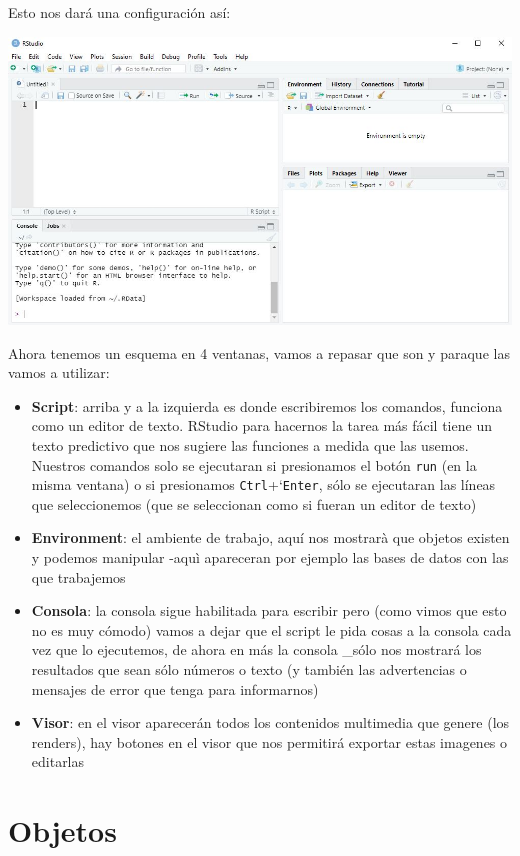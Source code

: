 \documentclass[
]{book}
\providecommand{\tightlist}{%
  \setlength{\itemsep}{0pt}\setlength{\parskip}{0pt}}
\begin{document}
Esto nos dará una configuración así:

\includegraphics[width=13.74in]{img/Rstudiofig3}

Ahora tenemos un esquema en 4 ventanas, vamos a repasar que son y paraque las vamos a utilizar:

\begin{itemize}
\tightlist
\item
  \textbf{Script}: arriba y a la izquierda es donde escribiremos los comandos, funciona como un editor de texto. RStudio para hacernos la tarea más fácil tiene un texto predictivo que nos sugiere las funciones a medida que las usemos. Nuestros comandos solo se ejecutaran si presionamos el botón \texttt{run} (en la misma ventana) o si presionamos \texttt{Ctrl}+`\texttt{Enter}, sólo se ejecutaran las líneas que seleccionemos (que se seleccionan como si fueran un editor de texto)
\item
  \textbf{Environment}: el ambiente de trabajo, aquí nos mostrarà que objetos existen y podemos manipular -aquì apareceran por ejemplo las bases de datos con las que trabajemos
\item
  \textbf{Consola}: la consola sigue habilitada para escribir pero (como vimos que esto no es muy cómodo) vamos a dejar que el script le pida cosas a la consola cada vez que lo ejecutemos, de ahora en más la consola \_sólo nos mostrará los resultados que sean sólo números o texto (y también las advertencias o mensajes de error que tenga para informarnos)
\item
  \textbf{Visor}: en el visor aparecerán todos los contenidos multimedia que genere (los renders), hay botones en el visor que nos permitirá exportar estas imagenes o editarlas
\end{itemize}

\hypertarget{objetos}{%
\section{Objetos}\label{objetos}}
\end{document}
